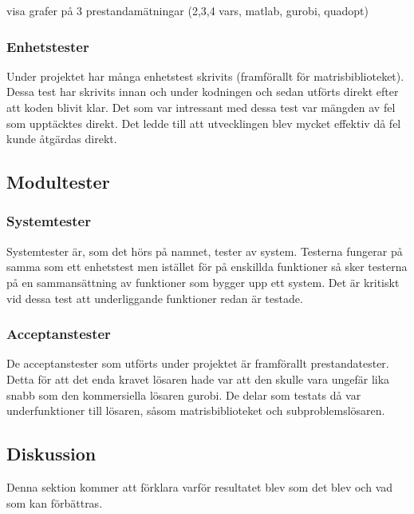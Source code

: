 	visa grafer på 3 prestandamätningar (2,3,4 vars, matlab, gurobi, quadopt) 	
	
	
	\subsubsection{Enhetstester}
	Under projektet har många enhetstest skrivits (framförallt för matrisbiblioteket). Dessa test har skrivits innan och under kodningen och sedan utförts direkt efter att koden blivit klar. Det som var intressant med dessa test var mängden av fel som upptäcktes direkt. Det ledde till att utvecklingen blev mycket effektiv då fel kunde åtgärdas direkt.
	
	\subsection{Modultester}
	
	\subsubsection{Systemtester}
	Systemtester är, som det hörs på namnet, tester av system. Testerna fungerar på samma som ett enhetstest men istället för på enskillda funktioner så sker testerna på en sammansättning av funktioner som bygger upp ett system. Det är kritiskt vid dessa test att underliggande funktioner redan är testade.
	\subsubsection{Acceptanstester}
	De acceptanstester som utförts under projektet är framförallt prestandatester. Detta för att det enda kravet lösaren hade var att den skulle vara ungefär lika snabb som den kommersiella lösaren gurobi. De delar som testats då var underfunktioner till lösaren, såsom matrisbiblioteket och subproblemslösaren.
	
	\subsection{Diskussion}
	Denna sektion kommer att förklara varför resultatet blev som det blev och vad som kan förbättras.	
	
